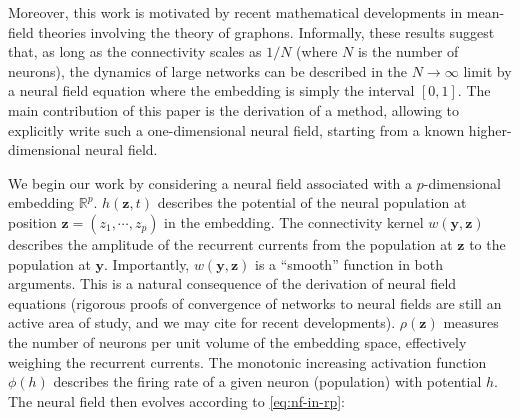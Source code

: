 \documentclass[NETN,manuscript]{stjour-new}
\def\R{\mathbb R}
\def\Rp{\R^p}
\renewcommand{\vec}[1]{\boldsymbol{#1}}
\begin{document}
Moreover, this work is motivated by recent mathematical developments \citep{JabPoy21} in mean-field theories involving the theory of graphons. Informally, these results suggest that, as long as the connectivity scales as $1/N$ (where $N$ is the number of neurons), the dynamics of large networks can be described in the $N \to \infty$ limit by a neural field equation where the embedding is simply the interval $[0,1]$. The main contribution of this paper is the derivation of a method, allowing to explicitly write such a one-dimensional neural field, starting from a known higher-dimensional neural field.





We begin our work by considering a neural field associated with a $p$-dimensional embedding $\Rp$. $h(\vec z, t)$ describes the potential of the neural population at position $\vec z=(z_1,\cdots,z_p)$ in the embedding. The connectivity kernel $w(\vec y, \vec z)$ describes the amplitude of the recurrent currents from the population at $\vec z$ to the population at $\vec y$. Importantly, $w(\vec y, \vec z)$ is a ``smooth'' function in both arguments. This is a natural consequence of the derivation of neural field equations (rigorous proofs of convergence of networks to neural fields are still an active area of study, and we may cite \citep{CheDua19,AGATHENERINE202286} for recent developments).
$\rho(\vec z)$ measures the number of neurons per unit volume of the embedding space, effectively weighing the recurrent currents. The monotonic increasing activation function $\phi(h)$ describes the firing rate of a given neuron (population) with potential $h$. The neural field then evolves according to \autoref{eq:nf-in-rp}:  
\end{document}
